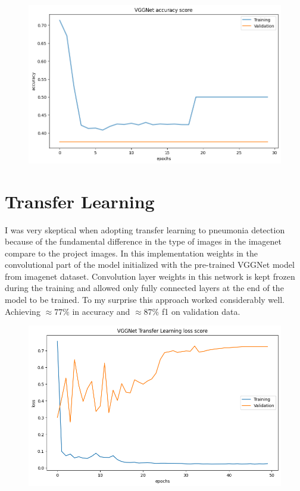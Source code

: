 \begin{figure}[H]
    \centering
    \includegraphics[width=.8\textwidth]{img/vggnetaccuracy.png}
    \caption{}
    \label{fig:vggacc}
\end{figure}


\section{Transfer Learning}
I was very skeptical when adopting transfer learning to pneumonia detection because of the fundamental difference in the type of images in the imagenet compare to the project images.
In this implementation weights in the convolutional part of the model initialized with the pre-trained VGGNet model from imagenet dataset.
Convolution layer weights in this network is kept frozen during the training and allowed only fully connected layers at the end of the model to be trained.
To my surprise this approach worked considerably well. Achieving $\approx 77 \%$ in accuracy and $\approx 87 \%$ f1 on validation data. 

\begin{figure}[H]
    \centering
    \includegraphics[width=.8\textwidth]{img/vggnettfloss.png}
    \caption{}
    \label{fig:vggtfloss}
\end{figure}

